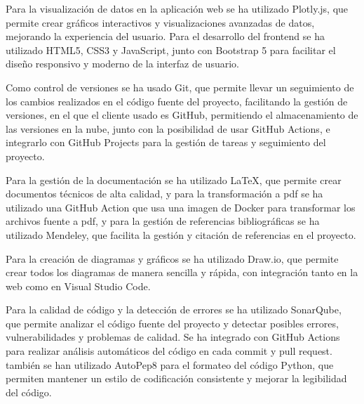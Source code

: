 Para la visualización de datos en la aplicación web se ha utilizado Plotly.js, que permite crear gráficos interactivos y visualizaciones avanzadas de datos, mejorando la experiencia del usuario. Para el desarrollo del frontend se ha utilizado HTML5, CSS3 y JavaScript, junto con Bootstrap 5 para facilitar el diseño responsivo y moderno de la interfaz de usuario.

Como control de versiones se ha usado Git, que permite llevar un seguimiento de los cambios realizados en el código fuente del proyecto, facilitando la gestión de versiones, en el que el cliente usado es GitHub, permitiendo el almacenamiento de las versiones en la nube, junto con la posibilidad de usar GitHub Actions, e integrarlo con GitHub Projects para la gestión de tareas y seguimiento del proyecto. 

Para la gestión de la documentación se ha utilizado LaTeX, que permite crear documentos técnicos de alta calidad, y para la transformación a pdf se ha utilizado una GitHub Action que usa una imagen de Docker para transformar los archivos fuente a pdf, y para la gestión de referencias bibliográficas se ha utilizado Mendeley, que facilita la gestión y citación de referencias en el proyecto.

Para la creación de diagramas y gráficos se ha utilizado Draw.io, que permite crear todos los diagramas de manera sencilla y rápida, con integración tanto en la web como en Visual Studio Code.

Para la calidad de código y la detección de errores se ha utilizado SonarQube, que permite analizar el código fuente del proyecto y detectar posibles errores, vulnerabilidades y problemas de calidad. Se ha integrado con GitHub Actions para realizar análisis automáticos del código en cada commit y pull request. también se han utilizado AutoPep8 para el formateo del código Python, que permiten mantener un estilo de codificación consistente y mejorar la legibilidad del código.



